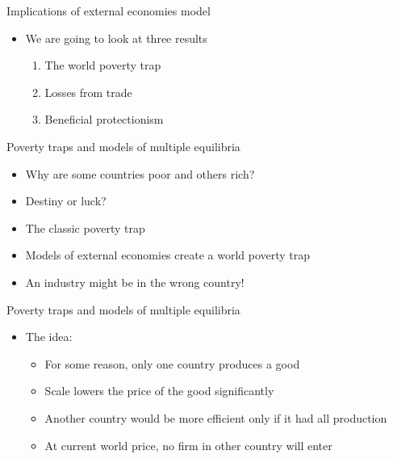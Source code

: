 \documentclass[ignorenonframetext,]{beamer}
\begin{document}
\begin{frame}{Implications of external economies model}

    \begin{itemize}
        \item We are going to look at three results
            \begin{enumerate}
                \item The world poverty trap
                \item Losses from trade
                \item Beneficial protectionism
            \end{enumerate}
    \end{itemize}
\end{frame}

\begin{frame}{Poverty traps and models of multiple equilibria}

    \begin{itemize}
        \item Why are some countries poor and others rich?
        \item Destiny or luck?
        \item The classic poverty trap
        \item Models of external economies create a world poverty trap
        \item An industry might be in the wrong country!
    \end{itemize}

\end{frame}

\begin{frame}{Poverty traps and models of multiple equilibria}

    \begin{itemize}
        \item The idea:
        \begin{itemize}
            \item For some reason, only one country produces a good
            \item Scale lowers the price of the good significantly
            \item Another country would be more efficient only if it had all production
            \item At current world price, no firm in other country will enter
        \end{itemize}
    \end{itemize}

\end{frame}
\end{document}
